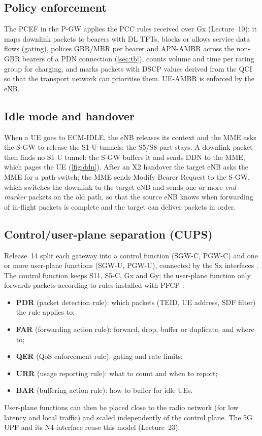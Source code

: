 \documentclass[11pt,a4paper]{article}
\begin{document}
\subsection{Policy enforcement}
The PCEF in the P-GW applies the PCC rules received over Gx (Lecture~10): it maps downlink packets to
bearers with DL TFTs, blocks or allows service data flows (gating), polices GBR/MBR per bearer and
APN-AMBR across the non-GBR bearers of a PDN connection (\cref{sec:tb}), counts volume and time per rating
group for charging, and marks packets with DSCP values derived from the QCI so that the transport network
can prioritise them. UE-AMBR is enforced by the eNB.

\subsection{Idle mode and handover}
When a UE goes to ECM-IDLE, the eNB releases its context and the MME asks the S-GW to release the S1-U
tunnels; the S5/S8 part stays. A downlink packet then finds no S1-U tunnel: the S-GW buffers it and
sends DDN to the MME, which pages the UE (\cref{fig:ddn}). After an X2 handover the target eNB asks the MME
for a path switch; the MME sends Modify Bearer Request to the S-GW, which switches the downlink to the
target eNB and sends one or more \emph{end marker} packets on the old path, so that the source eNB knows
when forwarding of in-flight packets is complete and the target can deliver packets in order.

\subsection{Control/user-plane separation (CUPS)}
Release~14 split each gateway into a control function (SGW-C, PGW-C) and one or more user-plane functions
(SGW-U, PGW-U), connected by the Sx interfaces \cite{ts23214}. The control function keeps S11, S5-C, Gx and
Gy; the user-plane function only forwards packets according to rules installed with PFCP \cite{ts29244}:
\begin{itemize}
  \item \textbf{PDR} (packet detection rule): which packets (TEID, UE address, SDF filter) the rule applies to;
  \item \textbf{FAR} (forwarding action rule): forward, drop, buffer or duplicate, and where to;
  \item \textbf{QER} (QoS enforcement rule): gating and rate limits;
  \item \textbf{URR} (usage reporting rule): what to count and when to report;
  \item \textbf{BAR} (buffering action rule): how to buffer for idle UEs.
\end{itemize}
User-plane functions can then be placed close to the radio network (for low latency and local traffic)
and scaled independently of the control plane. The 5G UPF and its N4 interface reuse this model
(Lecture~23).
\end{document}

